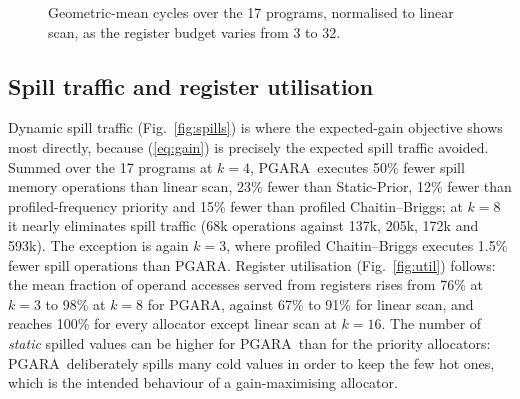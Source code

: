 \documentclass{ieeeaccess}
\newcommand{\MG}{PGARA}
\begin{document}
\begin{figure}[t]
\centering
{}
\caption{Geometric-mean cycles over the 17 programs, normalised to
linear scan, as the register budget varies from 3 to 32.}
\label{fig:ksweep}
\end{figure}

\subsection{Spill traffic and register utilisation}

Dynamic spill traffic (Fig.~\ref{fig:spills}) is where the
expected-gain objective shows most directly, because (\ref{eq:gain})
is precisely the expected spill traffic avoided. Summed over the 17
programs at $k=4$, \MG\ executes 50\% fewer spill memory operations than
linear scan, 23\% fewer than Static-Prior, 12\% fewer than
profiled-frequency priority and 15\% fewer than profiled
Chaitin--Briggs; at $k=8$ it nearly eliminates spill traffic (68k
operations against 137k, 205k, 172k and 593k). The exception is again
$k=3$, where profiled Chaitin--Briggs executes 1.5\% fewer spill
operations than \MG. Register utilisation (Fig.~\ref{fig:util})
follows: the mean fraction of operand accesses served from registers
rises from 76\% at $k=3$ to 98\% at $k=8$ for \MG, against 67\% to 91\%
for linear scan, and reaches 100\% for every allocator except linear
scan at $k=16$. The number of \emph{static} spilled values can be
higher for \MG\ than for the priority allocators: \MG\ deliberately
spills many cold values in order to keep the few hot ones, which is the
intended behaviour of a gain-maximising allocator.
\end{document}
